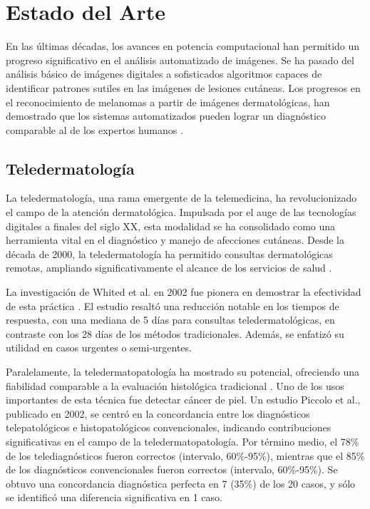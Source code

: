 \chapter{Estado del Arte}\label{chapter:state-of-the-art}

En las últimas décadas, los avances en potencia computacional han permitido un progreso significativo en el análisis automatizado de imágenes. Se ha pasado del análisis básico de imágenes digitales a sofisticados algoritmos capaces de identificar patrones sutiles en las imágenes de lesiones cutáneas. Los progresos en el reconocimiento de melanomas a partir de imágenes dermatológicas, han demostrado que los sistemas automatizados pueden lograr un diagnóstico comparable al de los expertos humanos .   

\section{Teledermatología}

La teledermatología, una rama emergente de la telemedicina, ha revolucionizado el campo de la atención dermatológica. Impulsada por el auge de las tecnologías digitales a finales del siglo XX, esta modalidad se ha consolidado como una herramienta vital en el diagnóstico y manejo de afecciones cutáneas. Desde la década de 2000, la teledermatología ha permitido consultas dermatológicas remotas, ampliando significativamente el alcance de los servicios de salud .

La investigación de Whited et al. en 2002 fue pionera en demostrar la efectividad de esta práctica . El estudio resaltó una reducción notable en los tiempos de respuesta, con una mediana de 5 días para consultas teledermatológicas, en contraste con los 28 días de los métodos tradicionales. Además, se enfatizó su utilidad en casos urgentes o semi-urgentes.

Paralelamente, la teledermatopatología ha mostrado su potencial, ofreciendo una fiabilidad comparable a la evaluación histológica tradicional . Uno de los usos importantes de esta técnica fue detectar cáncer de piel. Un estudio Piccolo et al.,  publicado en 2002, se centró en la concordancia entre los diagnósticos telepatológicos e histopatológicos convencionales, indicando contribuciones significativas en el campo de la teledermatopatología. Por término medio, el 78\% de los telediagnósticos fueron correctos (intervalo, 60\%-95\%), mientras que el 85\% de los diagnósticos convencionales fueron correctos (intervalo, 60\%-95\%). Se obtuvo una concordancia diagnóstica perfecta en 7 (35\%) de los 20 casos, y sólo se identificó una diferencia significativa en 1 caso.

